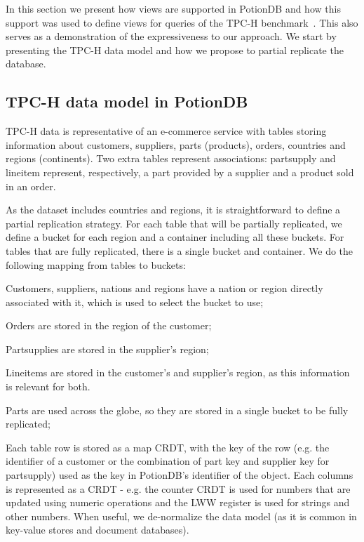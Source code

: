 \documentclass[sigconf, nonacm]{acmart}
\begin{document}
In this section we present how views are supported in PotionDB and how this support was used to
define views for queries of the TPC-H benchmark~\cite{tpch}. This also serves as a demonstration of
the expressiveness to our approach. We start by presenting the TPC-H data model and how we propose
to partial replicate the database.

\subsection{TPC-H data model in PotionDB}
\label{subsec:dataset}

TPC-H data is representative of an e-commerce service with tables storing information about customers, suppliers, parts (products), orders, 
countries and regions (continents).
Two extra tables represent associations: partsupply and lineitem represent, respectively, a part provided by a supplier
and a product sold in an order. 

As the dataset includes countries and regions, it is straightforward to define a partial replication strategy. 
For each table that will be partially replicated, we define a bucket for each region and a container including all these buckets.
For tables that are fully replicated, there is a single bucket and container. 
We do the following mapping from tables to buckets: 
\begin{inparaenum}[(i)]
\item Customers, suppliers, nations and regions have a nation or region directly
associated with it, which is used to select the bucket to use;
\item Orders are stored in the region of the customer;
\item Partsupplies are stored in the supplier's region;
\item Lineitems are stored in the customer's and supplier's region, as this information is relevant for both.
\item Parts are used across the globe, so they are stored in a single bucket to be fully replicated;
\end{inparaenum}

Each table row is stored as a map CRDT, with the key of the row (e.g. the identifier of a customer or the combination of part key and supplier key for partsupply) used as the key in PotionDB's identifier of the object. 
Each columns is represented as a CRDT - e.g. the counter CRDT is used for numbers that are updated using numeric operations and the
LWW register is used for strings and other numbers.
When useful, we de-normalize the data model (as it is common in key-value stores and document databases). 
\end{document}
